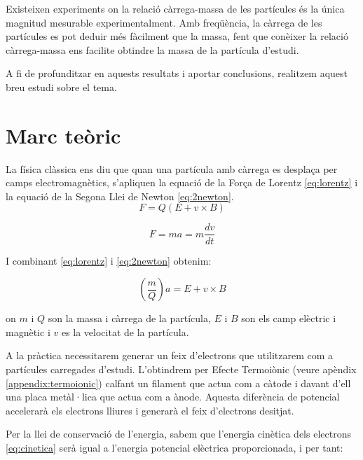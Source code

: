 \documentclass[11pt]{article}
\begin{document}
    \vspace{0.5cm}Existeixen experiments on la relació càrrega-massa de les partícules és la única magnitud mesurable experimentalment. Amb freqüència, la càrrega de les partícules es pot deduir més fàcilment que la massa, fent que conèixer la relació càrrega-massa ens facilite obtindre la massa de la partícula d'estudi.

    \vspace{0.5cm}A fi de profunditzar en aquests resultats i aportar conclusions, realitzem aquest breu estudi sobre el tema.
    
\section{Marc teòric}
    La física clàssica ens diu que quan una partícula amb càrrega es desplaça per camps electromagnètics, s'apliquen la equació de la Força de Lorentz \ref{eq:lorentz} i la equació de la Segona Llei de Newton \ref{eq:2newton}.
    \begin{equation}
        F = Q\left(E+v\times B\right)
        \label{eq:lorentz}
    \end{equation}
    
    \begin{equation}
        F = ma = m\frac{dv}{dt}
        \label{eq:2newton}
    \end{equation}

    I combinant \ref{eq:lorentz} i \ref{eq:2newton} obtenim:

    \begin{equation}
        \left(\frac{m}{Q}\right)a=E+v\times B
        \label{eq:carregamassa0.5}
    \end{equation}

    on $m$ i $Q$ son la massa i càrrega de la partícula, $E$ i $B$ son els camp elèctric i magnètic i $v$ es la velocitat de la partícula.
    
    \vspace{0.4cm}A la pràctica necessitarem generar un feix d'electrons que utilitzarem com a partícules carregades d'estudi. L'obtindrem per Efecte Termoiònic (veure apèndix \ref{appendix:termoionic}) calfant un filament que actua com a càtode i davant d'ell una placa metàl·lica que actua com a ànode. Aquesta diferència de potencial accelerarà els electrons lliures i generarà el feix d'electrons desitjat.

    \vspace{0.4cm}Per la llei de conservació de l'energia, sabem que l'energia cinètica dels electrons \ref{eq:cinetica} serà igual a l'energia potencial elèctrica proporcionada, i per tant:
\end{document}
